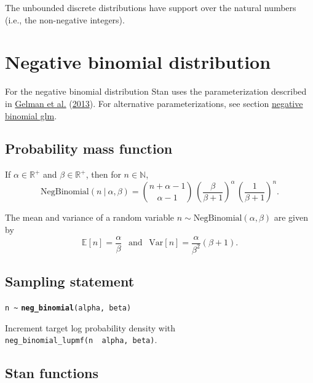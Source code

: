\documentclass[
  10pt,
]{book}
\begin{document}
The unbounded discrete distributions have support over the natural
numbers (i.e., the non-negative integers).

\hypertarget{negative-binomial-distribution}{%
\section{Negative binomial distribution}\label{negative-binomial-distribution}}

For the negative binomial distribution Stan uses the parameterization
described in \protect\hyperlink{ref-GelmanEtAl:2013}{Gelman et al.} (\protect\hyperlink{ref-GelmanEtAl:2013}{2013}). For alternative parameterizations, see
section \protect\hyperlink{neg-binom-2-log}{negative binomial glm}.

\hypertarget{probability-mass-function-10}{%
\subsection{Probability mass function}\label{probability-mass-function-10}}

If \(\alpha \in \mathbb{R}^+\) and \(\beta \in \mathbb{R}^+\), then for \(n \in \mathbb{N}\), \[ \text{NegBinomial}(n~|~\alpha,\beta) = \binom{n +
\alpha - 1}{\alpha - 1} \, \left( \frac{\beta}{\beta+1}
\right)^{\!\alpha} \, \left( \frac{1}{\beta + 1} \right)^{\!n} \!. \]

The mean and variance of a random variable \(n \sim \text{NegBinomial}(\alpha,\beta)\) are given by \[ \mathbb{E}[n] =
\frac{\alpha}{\beta} \ \ \text{ and } \ \ \text{Var}[n] =
\frac{\alpha}{\beta^2} (\beta + 1). \]

\hypertarget{sampling-statement-13}{%
\subsection{Sampling statement}\label{sampling-statement-13}}

\texttt{n\ \textasciitilde{}} \textbf{\texttt{neg\_binomial}}\texttt{(alpha,\ beta)}

Increment target log probability density with \texttt{neg\_binomial\_lupmf(n\ \textbar{}\ alpha,\ beta)}.

\hypertarget{stan-functions-12}{%
\subsection{Stan functions}\label{stan-functions-12}}
\end{document}
